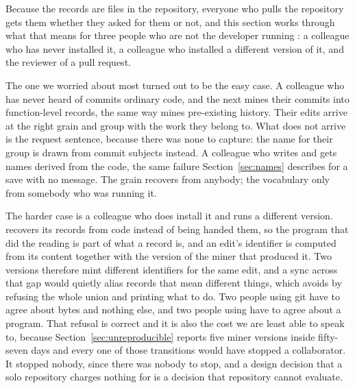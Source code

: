 Because the records are files in the repository, everyone who pulls the repository
gets them whether they asked for them or not, and this section works through what
that means for three people who are not the developer running \sgt{}: a colleague
who has never installed it, a colleague who installed a different version of it,
and the reviewer of a pull request.

The one we worried about most turned out to be the easy case. A colleague who has
never heard of \sgt{} commits ordinary code, and the next  mines
their commits into function-level records, the same way \sgt{} mines pre-existing
history. Their edits arrive at the right grain and group with the work they belong
to. What does not arrive is the request sentence, because there was none to
capture: the name for their group is drawn from commit subjects instead. A
colleague who writes  and  gets names derived from the
code, the same failure Section~\ref{sec:names} describes for a save with no
message. The grain \sgt{} recovers from anybody; the vocabulary only from somebody
who was running it.

The harder case is a colleague who does install it and runs a different version.
\sgt{} recovers its records from code instead of being handed them, so the program
that did the reading is part of what a record is, and an edit's identifier is
computed from its content together with the version of the miner that produced it.
Two versions therefore mint different identifiers for the same edit, and a sync
across that gap would quietly alias records that mean different things, which \sgt{}
avoids by refusing the whole union and printing what to do. Two people using git
have to agree about bytes and nothing else, and two people using \sgt{} have to
agree about a program. That refusal
is correct and it is also the cost we are least able to speak to, because
Section~\ref{sec:unreproducible} reports five miner versions inside fifty-seven days
and every one of those transitions would have stopped a collaborator. It stopped
nobody, since there was nobody to stop, and a design decision that a solo repository
charges nothing for is a decision that repository cannot evaluate.

